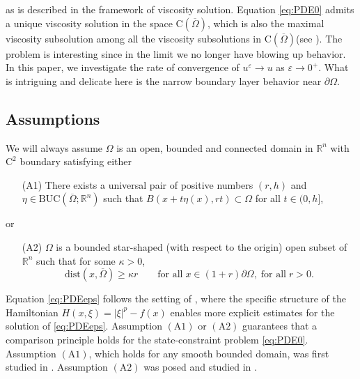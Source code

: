 \documentclass[12pt,reqno]{amsart}
\numberwithin{figure}{section}
\theoremstyle{plain}
\theoremstyle{remark}
\numberwithin{equation}{section}
\newcommand{\rmC}{\mathrm{C}}
\begin{document}
as is described in the framework of viscosity solution.
Equation \eqref{eq:PDE0} admits a unique viscosity solution in the space $\rmC(\overline{\Omega})$, which is also the maximal viscosity subsolution among all the viscosity subsolutions in $\rmC(\overline{\Omega})$(see \cite{Capuzzo-Dolcetta1990,Soner1986}). The problem is interesting since in the limit we no longer have blowing up behavior. In this paper, we investigate the rate of convergence of $u^\varepsilon \to u$ as $\varepsilon\to 0^+$. What is intriguing and delicate here is the narrow boundary layer behavior near $\partial \Omega$.
\subsection{Assumptions} We will always assume $\Omega$ is an open, bounded and connected domain in $\mathbb{R}^n$ with $\mathrm{C}^2$ boundary satisfying either %
\begin{itemize}    
    \item[(A1)] There exists a universal pair of positive numbers $(r,h)$ and $\eta\in \mathrm{BUC}(\overline{\Omega};\mathbb{R}^n)$ such that $B(x+t\eta(x), rt)\subset\Omega$ for all $t\in (0,h]$,
    \end{itemize}
    or
    \begin{itemize}
    \item[(A2)] $\Omega$ is a bounded star-shaped (with respect to the origin) open subset of $\mathbb{R}^n$ such that for some $\kappa > 0$,
    \begin{equation*}
        \mathrm{dist}(x,\overline{\Omega}) \geq \kappa r \qquad\text{for all}\; x\in (1+r) \partial\Omega, \;\text{for all}\;r>0.
    \end{equation*}
\end{itemize}
Equation \eqref{eq:PDEeps} follows the setting of \cite{Lasry1989}, where the specific structure of the Hamiltonian $H(x,\xi) = |\xi|^p - f(x)$ enables more explicit estimates for the solution of \eqref{eq:PDEeps}. Assumption $\mathrm{(A1)}$ or $\mathrm{(A2)}$ guarantees that a comparison principle holds for the state-constraint problem \eqref{eq:PDE0}. Assumption $\mathrm{(A1)}$, which holds for any smooth bounded domain, was first studied in \cite{Soner1986}. Assumption $\mathrm{(A2)}$ was posed and studied in \cite{Capuzzo-Dolcetta1990}. 
\end{document}
